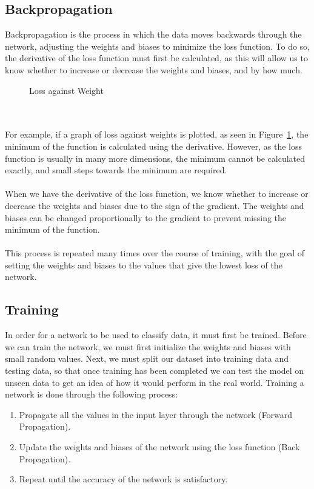 \documentclass[titlepage]{article}
\begin{document}
\subsection{Backpropagation}
Backpropagation is the process in which the data moves backwards through the network, adjusting the weights and biases to minimize the loss function. To do so, the derivative of the loss function must first be calculated, as this will allow us to know whether to increase or decrease the weights and biases, and by how much.
\begin{figure}[h!]
    \begin{center}
    \end{center}
    \caption{Loss against Weight}
    \label{fig:loss-vs-weights}
\end{figure}
\\\\
For example, if a graph of loss against weights is plotted, as seen in Figure~\ref{fig:loss-vs-weights}, the minimum of the function is calculated using the derivative. However, as the loss function is usually in many more dimensions, the minimum cannot be calculated exactly, and small steps towards the minimum are required. 
\\\\
When we have the derivative of the loss function, we know whether to increase or decrease the weights and biases due to the sign of the gradient. The weights and biases can be changed proportionally to the gradient to prevent missing the minimum of the function.
\\\\
This process is repeated many times over the course of training, with the goal of setting the weights and biases to the values that give the lowest loss of the network.
\subsection{Training}
In order for a network to be used to classify data, it must first be trained. Before we can train the network, we must first initialize the weights and biases with small random values. Next, we must split our dataset into training data and testing data, so that once training has been completed we can test the model on unseen data to get an idea of how it would perform in the real world. Training a network is done through the following process:
\begin{enumerate}
    \item Propagate all the values in the input layer through the network (Forward Propagation).
    \item Update the weights and biases of the network using the loss function (Back Propagation).
    \item Repeat until the accuracy of the network is satisfactory.
\end{enumerate}
\newpage
\end{document}
